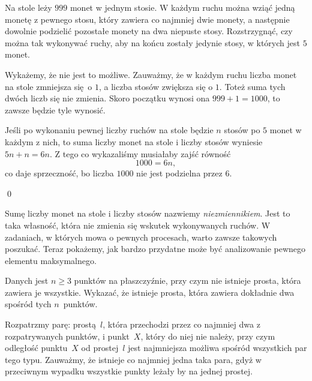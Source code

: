 



\noindent
Na stole leży $999$ monet w jednym stosie. W każdym ruchu można wziąć jedną monetę z pewnego stosu, który zawiera co najmniej dwie monety, a następnie dowolnie podzielić pozostałe monety na dwa niepuste stosy. Rozstrzygnąć, czy można tak wykonywać ruchy, aby na końcu zostały jedynie stosy, w których jest $5$ monet.

\vspace{5px}

\noindent
Wykażemy, że nie jest to możliwe. Zauważmy, że w każdym ruchu liczba monet na stole zmniejsza się o $1$, a liczba stosów zwiększa się o $1$. Toteż suma tych dwóch liczb się nie zmienia. Skoro początku wynosi ona $999 + 1 = 1000$, to zawsze będzie tyle wynosić.

\vspace{10px}
\noindent
Jeśli po wykonaniu pewnej liczby ruchów na stole będzie $n$ stosów po $5$ monet w każdym z nich, to suma liczby monet na stole i liczby stosów wyniesie $5n + n = 6n$. Z tego co wykazaliśmy musiałaby zajść równość
\[
	1000 = 6n,
\]
co daje sprzeczność, bo liczba $1000$ nie jest podzielna przez $6$.

\qed

\noindent
Sumę liczby monet na stole i liczby stosów nazwiemy \textit{niezmiennikiem}. Jest to taka własność, która nie zmienia się wskutek wykonywanych ruchów. W zadaniach, w których mowa o pewnych procesach, warto zawsze takowych poszukać. Teraz pokażemy, jak bardzo przydatne może być analizowanie pewnego elementu maksymalnego.

\vspace{10px}


\noindent
Danych jest $n \geqslant 3$ punktów na płaszczyźnie, przy czym nie istnieje prosta, która zawiera je wszystkie. Wykazać, że istnieje prosta, która zawiera dokładnie dwa spośród tych $n$~punktów.

\vspace{5px}

\noindent
Rozpatrzmy parę: prostą~$l$, która przechodzi przez co najmniej dwa z rozpatrywanych punktów, i punkt~$X$, który do niej nie należy, przy czym odległość punktu~$X$ od prostej~$l$ jest najmniejsza możliwa spośród wszystkich par tego typu. Zauważmy, że istnieje co najmniej jedna taka para, gdyż w przeciwnym wypadku wszystkie punkty leżały by na jednej prostej. 

